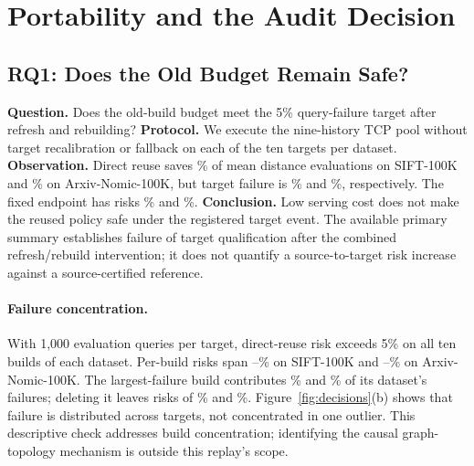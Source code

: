 \section{Portability and the Audit Decision}
\label{sec:portability}

\subsection{RQ1: Does the Old Budget Remain Safe?}
\textbf{Question.} Does the old-build budget meet the 5\% query-failure target after refresh and rebuilding?
\textbf{Protocol.} We execute the nine-history TCP pool without target recalibration or fallback on each of the ten targets per dataset.
\textbf{Observation.} Direct reuse saves \WZeroSiftSourceGain\% of mean distance evaluations on SIFT-100K and \WZeroArxivSourceGain\% on Arxiv-Nomic-100K, but target failure is \WZeroSiftSourceRisk\% and \WZeroArxivSourceRisk\%, respectively. The fixed endpoint has risks \WFiveSiftEndpointRisk\% and \WFiveArxivEndpointRisk\%.
\textbf{Conclusion.} Low serving cost does not make the reused policy safe under the registered target event. The available primary summary establishes failure of target qualification after the combined refresh/rebuild intervention; it does not quantify a source-to-target risk increase against a source-certified reference.

\paragraph{Failure concentration.}
With 1,000 evaluation queries per target, direct-reuse risk exceeds 5\% on all ten builds of each dataset. Per-build risks span \WFiftyFiveSiftMinRisk--\WFiftyFiveSiftMaxRisk\% on SIFT-100K and \WFiftyFiveArxivMinRisk--\WFiftyFiveArxivMaxRisk\% on Arxiv-Nomic-100K. The largest-failure build contributes \WFiftyFiveSiftMaxShare\% and \WFiftyFiveArxivMaxShare\% of its dataset's failures; deleting it leaves risks of \WFiftyFiveSiftDeleteRisk\% and \WFiftyFiveArxivDeleteRisk\%. Figure~\ref{fig:decisions}(b) shows that failure is distributed across targets, not concentrated in one outlier. This descriptive check addresses build concentration; identifying the causal graph-topology mechanism is outside this replay's scope.

